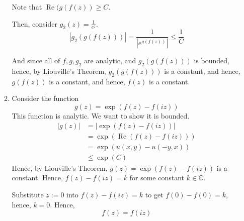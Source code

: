 \documentclass{article}
\newcommand{\C}{\mathbb{C}}
\DeclareMathOperator{\real}{Re}
\begin{document}
\begin{enumerate}
\begin{enumerate}
Note that $\real(g(f(z)) \geq C$.

Then, consider $g_2(z) = \frac{1}{e^{z}}$.
\[|g_2(g(f(z)))| = \frac{1}{|e^{g(f(z))}|} \leq \frac{1}{C}\]

And since all of $f,g,g_2$ are analytic, and $g_2(g(f(z)))$ is bounded, hence, by Liouville's Theorem, $g_2(g(f(z)))$ is a constant, and hence, $g(f(z))$ is a constant, and hence, $f(z)$ is a constant.
\item Consider the function
\[
g(z) = \exp(f(z)-f(iz))
\]
This function is analytic. We want to show it is bounded.
\begin{align*}
|g(z)| &= |\exp(f(z)-f(iz))| \\
    &= \exp(\real(f(z)-f(iz))) \\
    &= \exp(u(x,y) - u(-y,x)) \\
    &\leq \exp(C)
\end{align*}
Hence, by Liouville's Theorem, $g(z) = \exp(f(z)-f(iz))$ is a constant. Hence, $f(z)-f(iz)=k$ for some constant $k \in \C$.

Substitute $z:=0$ into $f(z)-f(iz)=k$ to get $f(0)-f(0)=k$, hence, $k=0$. Hence,
\[f(z)=f(iz)\]
\end{enumerate}

\end{enumerate}
\end{document}

